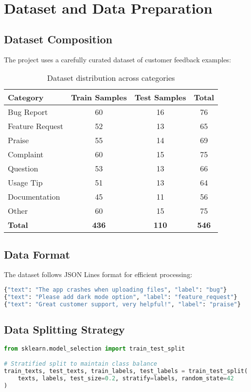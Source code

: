 \documentclass[11pt,a4paper]{article}
\begin{document}
\section{Dataset and Data Preparation}

\subsection{Dataset Composition}
The project uses a carefully curated dataset of customer feedback examples:

\begin{table}[h!]
\centering
\begin{tabular}{|l|c|c|c|}
\hline
\textbf{Category} & \textbf{Train Samples} & \textbf{Test Samples} & \textbf{Total} \\
\hline
Bug Report & 60 & 16 & 76 \\
Feature Request & 52 & 13 & 65 \\
Praise & 55 & 14 & 69 \\
Complaint & 60 & 15 & 75 \\
Question & 53 & 13 & 66 \\
Usage Tip & 51 & 13 & 64 \\
Documentation & 45 & 11 & 56 \\
Other & 60 & 15 & 75 \\
\hline
\textbf{Total} & \textbf{436} & \textbf{110} & \textbf{546} \\
\hline
\end{tabular}
\caption{Dataset distribution across categories}
\end{table}

\subsection{Data Format}
The dataset follows JSON Lines format for efficient processing:

\begin{lstlisting}[style=code,language=Python]
{"text": "The app crashes when uploading files", "label": "bug"}
{"text": "Please add dark mode option", "label": "feature_request"}
{"text": "Great customer support, very helpful!", "label": "praise"}
\end{lstlisting}

\subsection{Data Splitting Strategy}
\begin{lstlisting}[style=code,language=Python]
from sklearn.model_selection import train_test_split

# Stratified split to maintain class balance
train_texts, test_texts, train_labels, test_labels = train_test_split(
    texts, labels, test_size=0.2, stratify=labels, random_state=42
)
\end{lstlisting}
\end{document}
